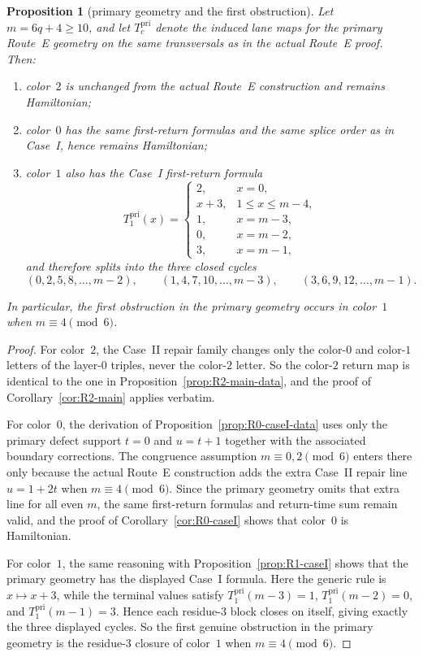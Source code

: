 \documentclass[11pt]{article}
\newtheorem{proposition}{Proposition}
\begin{document}
\begin{proposition}[primary geometry and the first obstruction]\label{prop:primary-geometry-obstruction}
Let $m=6q+4\ge 10$, and let $T_c^{\mathrm{pri}}$ denote the induced lane maps for the primary Route~E geometry on the same transversals as in the actual Route~E proof.
Then:
\begin{enumerate}[label=\textup{(\roman*)},leftmargin=2.5em]
\item color~$2$ is unchanged from the actual Route~E construction and remains Hamiltonian;
\item color~$0$ has the same first-return formulas and the same splice order as in Case~I, hence remains Hamiltonian;
\item color~$1$ also has the Case~I first-return formula
\[
T_1^{\mathrm{pri}}(x)=
\begin{cases}
2,&x=0,\\
x+3,&1\le x\le m-4,\\
1,&x=m-3,\\
0,&x=m-2,\\
3,&x=m-1,
\end{cases}
\]
and therefore splits into the three closed cycles
\[
(0,2,5,8,\dots,m-2),
\qquad
(1,4,7,10,\dots,m-3),
\qquad
(3,6,9,12,\dots,m-1).
\]
\end{enumerate}
In particular, the first obstruction in the primary geometry occurs in color~$1$ when $m\equiv 4\pmod 6$.
\end{proposition}

\begin{proof}
For color~$2$, the Case~II repair family changes only the color-$0$ and color-$1$ letters of the layer-$0$ triples, never the color-$2$ letter.
So the color-$2$ return map is identical to the one in Proposition~\ref{prop:R2-main-data}, and the proof of Corollary~\ref{cor:R2-main} applies verbatim.

For color~$0$, the derivation of Proposition~\ref{prop:R0-caseI-data} uses only the primary defect support $t=0$ and $u=t+1$ together with the associated boundary corrections.
The congruence assumption $m\equiv 0,2\pmod 6$ enters there only because the actual Route~E construction adds the extra Case~II repair line $u=1+2t$ when $m\equiv 4\pmod 6$.
Since the primary geometry omits that extra line for all even $m$, the same first-return formulas and return-time sum remain valid, and the proof of Corollary~\ref{cor:R0-caseI} shows that color~$0$ is Hamiltonian.

For color~$1$, the same reasoning with Proposition~\ref{prop:R1-caseI} shows that the primary geometry has the displayed Case~I formula.
Here the generic rule is $x\mapsto x+3$, while the terminal values satisfy $T_1^{\mathrm{pri}}(m-3)=1$, $T_1^{\mathrm{pri}}(m-2)=0$, and $T_1^{\mathrm{pri}}(m-1)=3$.
Hence each residue-$3$ block closes on itself, giving exactly the three displayed cycles.
So the first genuine obstruction in the primary geometry is the residue-$3$ closure of color~$1$ when $m\equiv 4\pmod 6$.
\end{proof}
\end{document}
